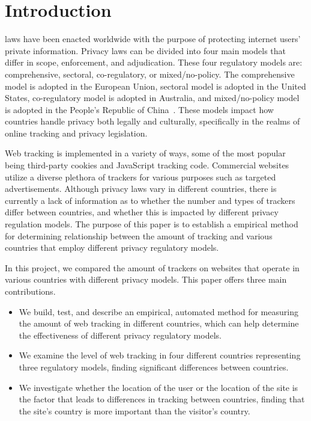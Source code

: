 \documentclass[conference]{IEEEtran}
\begin{document}
\section{Introduction}
% 
% 
% 
% 
laws have been enacted worldwide with the purpose of protecting internet users' private information. Privacy laws can be divided into four main models
 \cite{IAPPbook} that differ in scope, enforcement, and adjudication. These four regulatory models are: comprehensive, sectoral, co-regulatory, or mixed/no-policy. The comprehensive model is adopted in the European Union, sectoral model is adopted in the United States,  co-regulatory model is adopted in Australia, and mixed/no-policy model is adopted in the People's Republic of China~\cite{solove2006model, IAPPbook}. These models impact how countries handle privacy both legally and culturally, specifically in the realms of online tracking and privacy legislation. 

Web tracking is implemented in a variety of ways, some of the most popular being third-party cookies and JavaScript tracking code. Commercial websites utilize a diverse plethora of trackers for various purposes such as targeted advertisements. Although privacy laws vary in different countries, there is currently a lack of information as to whether the number and types of trackers differ between countries, and whether this is impacted by different privacy regulation models. The purpose of this paper is to establish a empirical method for determining relationship between the amount of tracking and various countries that employ different privacy regulatory models.

In this project, we compared the amount of trackers on websites that operate in various countries with different privacy models. This paper offers three main contributions.
\begin{itemize}
\item We build, test, and describe an empirical, automated method for measuring the amount of web tracking in different countries, which can help determine the effectiveness of different privacy regulatory models.
\item We examine the level of web tracking in four different countries representing three regulatory models, finding significant differences between countries.
\item We investigate whether the location of the user or the location of the site is the factor that leads to differences in tracking between countries, finding that the site's country is more important than the visitor's country.
\end{itemize}
\end{document}
